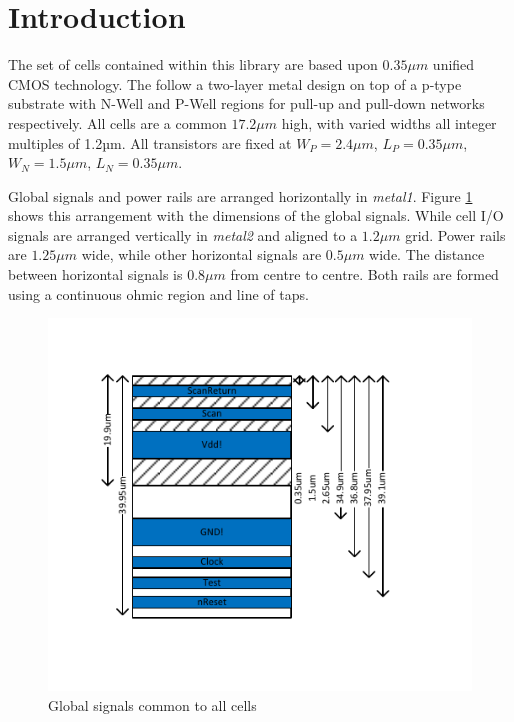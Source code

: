 \newpage
\section*{Introduction}

The set of cells contained within this library are based upon $0.35\mu m$ unified CMOS technology. The follow a two-layer metal design on top of a p-type substrate with N-Well and P-Well regions for pull-up and pull-down networks respectively. All cells are a common $17.2\mu m$ high, with varied widths all integer multiples of 1.2µm. 
All transistors are fixed at $W_P = 2.4\mu m$, $L_P = 0.35\mu m$, $W_N = 1.5\mu m$, $L_N = 0.35\mu m$.


Global signals and power rails are arranged horizontally in \textit{metal1}.
Figure \ref{fig:globalsignals} shows this arrangement with the dimensions of the global signals.
While cell I/O signals are arranged vertically in \textit{metal2} and aligned to a $1.2\mu m$ grid.
Power rails are $1.25\mu m$ wide, while other horizontal signals are $0.5\mu m$ wide. 
The distance between horizontal signals is $0.8\mu m$ from centre to centre. 
Both rails are formed using a continuous ohmic region and line of taps. 

\begin{figure}[htb!]
\includegraphics[width=\textwidth]{cellglobals.pdf}
\caption{Global signals common to all cells}
\label{fig:globalsignals}
\end{figure}

